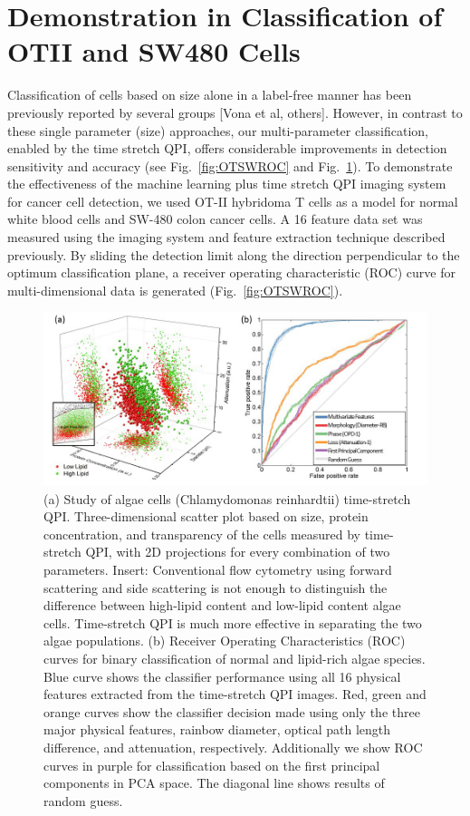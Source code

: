 \documentclass[aps,pra,reprint,superscriptaddress]{revtex4-1}
\begin{document}
\section{Demonstration in Classification of OTII and SW480 Cells}

Classification of cells based on size alone in a label-free manner has been previously reported by several groups [Vona et al, others]. However, in contrast to these single parameter (size) approaches, our multi-parameter classification, enabled by the time stretch QPI, offers considerable improvements in detection sensitivity and accuracy (see Fig.~\ref{fig:OTSWROC} and Fig.~\ref{fig:AlgaeScatter}). To demonstrate the effectiveness of the machine learning plus time stretch QPI imaging system for cancer cell detection, we used OT-II hybridoma T cells as a model for normal white blood cells and SW-480 colon cancer cells. A 16 feature data set was measured using the imaging system and feature extraction technique described previously. By sliding the detection limit along the direction perpendicular to the optimum classification plane, a receiver operating characteristic (ROC) curve for multi-dimensional data is generated (Fig.~\ref{fig:OTSWROC}).

\begin{figure}
\includegraphics[scale=0.5]{FigureAlgaeScatter.jpg}
\caption{\label{fig:AlgaeScatter} (a) Study of algae cells (Chlamydomonas reinhardtii) time-stretch QPI. Three-dimensional scatter plot based on size, protein concentration, and transparency of the cells measured by time-stretch QPI, with 2D projections for every combination of two parameters. Insert: Conventional flow cytometry using forward scattering and side scattering is not enough to distinguish the difference between high-lipid content and low-lipid content algae cells. Time-stretch QPI is much more effective in separating the two algae populations. (b) Receiver Operating Characteristics (ROC) curves for binary classification of normal and lipid-rich algae species. Blue curve shows the classifier performance using all 16 physical features extracted from the time-stretch QPI images. Red, green and orange curves show the classifier decision made using only the three major physical features, rainbow diameter, optical path length difference, and attenuation, respectively. Additionally we show ROC curves in purple for classification based on the first principal components in PCA space. The diagonal line shows results of random guess. }
\end{figure}
\end{document}
